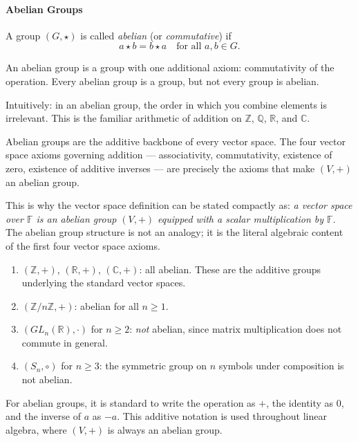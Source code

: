 \paragraph{Abelian Groups}

\begin{definition}
\label{def:notes-groups-abelian-l6}
A group $(G, \star)$ is called \emph{abelian} (or \emph{commutative}) if
\[
a \star b = b \star a \quad \text{for all } a, b \in G.
\]
\end{definition}

\begin{remark}
An abelian group is a group with one additional axiom: commutativity
of the operation. Every abelian group is a group, but not every group
is abelian.

Intuitively: in an abelian group, the order in which you combine
elements is irrelevant. This is the familiar arithmetic of addition
on $\mathbb{Z}$, $\mathbb{Q}$, $\mathbb{R}$, and $\mathbb{C}$.
\end{remark}

\begin{remark}
Abelian groups are the additive backbone of every vector space.
The four vector space axioms governing addition --- associativity,
commutativity, existence of zero, existence of additive inverses ---
are precisely the axioms that make $(V, +)$ an abelian group.

This is why the vector space definition can be stated compactly as:
\emph{a vector space over $\mathbb{F}$ is an abelian group $(V,+)$
equipped with a scalar multiplication by $\mathbb{F}$}.
The abelian group structure is not an analogy; it is the literal
algebraic content of the first four vector space axioms.
\end{remark}

\begin{example}
\begin{enumerate}[label=(\roman*)]
  \item $(\mathbb{Z}, +)$, $(\mathbb{R}, +)$, $(\mathbb{C}, +)$:
        all abelian. These are the additive groups underlying the
        standard vector spaces.

  \item $(\mathbb{Z}/n\mathbb{Z}, +)$: abelian for all $n \geq 1$.

  \item $(GL_n(\mathbb{R}), \cdot)$ for $n \geq 2$: \emph{not} abelian,
        since matrix multiplication does not commute in general.

  \item $(S_n, \circ)$ for $n \geq 3$: the symmetric group on $n$ symbols
        under composition is not abelian.
\end{enumerate}
\end{example}

\begin{remark}
For abelian groups, it is standard to write the operation as $+$,
the identity as $0$, and the inverse of $a$ as $-a$.
This additive notation is used throughout linear algebra, where
$(V, +)$ is always an abelian group.
\end{remark}
